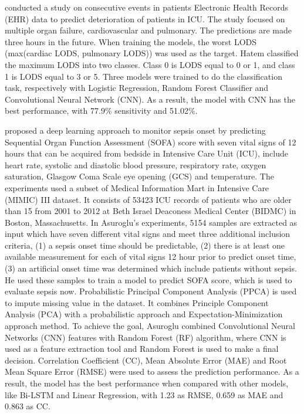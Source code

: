 \documentclass[12pt,a4paper,english
]{tunithesis}
\begin{document}
\textcite{hatem2018} conducted a study on consecutive events in patients Electronic Health Records
(EHR) data to predict deterioration of patients in ICU. The study focused on multiple organ failure, cardiovascular and pulmonary. The predictions are made three hours in the future. When training the models, the worst LODS (max(cardiac LODS, pulmonary LODS)) was used as the target. Hatem classified the maximum LODS into two classes. Class 0 is LODS equal to 0 or 1, and class 1 is LODS equal to 3 or 5. Three models were trained to do the classification task, respectively with Logistic Regression, Random Forest Classifier and Convolutional Neural Network (CNN). As a result, the model with CNN has the best performance, with 77.9\% sensitivity and 51.02\%. 

\textcite{asuroglu2021} proposed a deep learning approach to monitor sepsis onset by predicting Sequential Organ Function Assessment (SOFA) score with seven vital signs of 12 hours that can be acquired from bedside in Intensive Care Unit (ICU), include heart rate, systolic and diastolic blood pressure, respiratory rate, oxygen saturation, Glasgow Coma Scale eye opening (GCS) and temperature. The experiments used a subset of Medical Information Mart in Intensive Care (MIMIC) III dataset. It consists of 53423 ICU records of patients who are older than 15 from 2001 to 2012 at Beth Israel Deaconess Medical Center (BIDMC) in Boston, Massachusetts. In Asuroglu's experiments, 5154 samples are extracted as input which have seven different vital signs and meet three additional inclusion criteria, (1) a sepsis onset time should be predictable, (2) there is at least one available measurement for each of vital signs 12 hour prior to predict onset time, (3) an artificial onset time was determined which include patients without sepsis. He used these samples to train a model to predict SOFA score, which is used to evaluate sepsis now. Probabilistic Principal Component Analysis (PPCA) is used to impute missing value in the dataset. It combines Principle Component Analysis (PCA) with a probabilistic approach and Expectation-Minimization approach method. To achieve the goal, Asuroglu combined Convolutional Neural Networks (CNN) features with Random Forest (RF) algorithm, where CNN is used as a feature extraction tool and Random Forest is used to make a final decision. Correlation Coefficient (CC), Mean Absolute Error (MAE) and Root Mean Square Error (RMSE) were used to assess the prediction performance. As a result, the model has the best performance when compared with other models, like Bi-LSTM and Linear Regression, with 1.23 as RMSE, 0.659 as MAE and 0.863 as CC.
\end{document}
